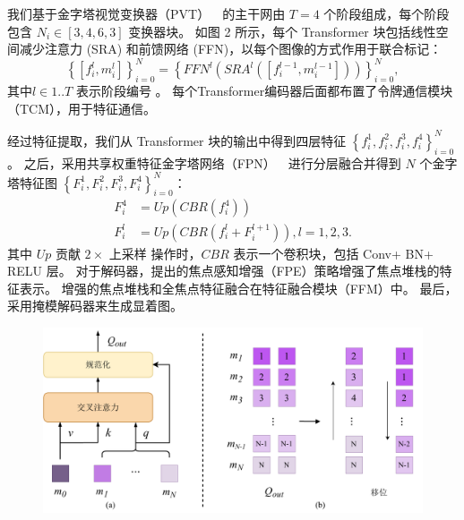 我们基于金字塔视觉变换器（PVT）~\cite{wang2022pvt}~的主干网由 $T = 4$ 个阶段组成，每个阶段包含
$ N_{i} \in [3,4,6,3] $ 变换器块。 如图 2 所示，每个 Transformer 块包括线性空间减少注意力 (SRA) 和前馈网络 (FFN)，以每个图像的方式作用于联合标记：
\begin{equation}
	\left \{ [f_{i}^{l}, m_{i}^{l}]\right \}_{i=0}^{N} = \left \{ FFN^{l} \left  ( SRA^{l} \left ( [f_{i}^{l-1}, m_{i}^{l-1}]\right )\right )\right \}_{i=0}^{N},
\end{equation}
其中$ l \in 1..T $ 表示阶段编号 。 每个Transformer编码器后面都布置了令牌通信模块（TCM），用于特征通信。 
%
%
%
%
%
\par
经过特征提取，我们从 Transformer 块的输出中得到四层特征 
$\left \{ f_{i}^{1},f_{i}^{2},f_{i}^{3},f_{i}^{4} \right \}_{i=0}^{N}$ 。 
之后，采用共享权重特征金字塔网络（FPN）~\cite{lin2017feature}~进行分层融合并得到 $N$ 个金字塔特征图	$ \left \{F_{i}^{1},F_{i}^{2},F_{i}^{3},F_{i}^{4} \right \}_{i=0}^{N}$：
\begin{equation}
	\begin{aligned}
		F_{i}^{4} &= Up \left ( CBR \left ( f_{i}^{4} \right )\right ) \\ 
		F_{i}^{l} &= Up \left ( CBR \left ( f_{i}^{l} + F_{i}^{l+1} \right )  \right ),l=1,2,3  .
	\end{aligned}
\end{equation}
其中 $Up$ 贡献 $2 \times $ 上采样 操作时，$CBR$ 表示一个卷积块，包括 Conv+ BN+ RELU 层。 对于解码器，提出的焦点感知增强（FPE）策略增强了焦点堆栈的特征表示。 增强的焦点堆栈和全焦点特征融合在特征融合模块（FFM）中。 最后，采用掩模解码器来生成显着图。
%
%
%
%
%
%
%
%
%
%
\begin{figure}[!ht]
	\centering
	\includegraphics[width=0.95\linewidth]{figures/chapter3/token-interaction.drawio}
	\label{cpt3_fig1:idea}
\end{figure}
